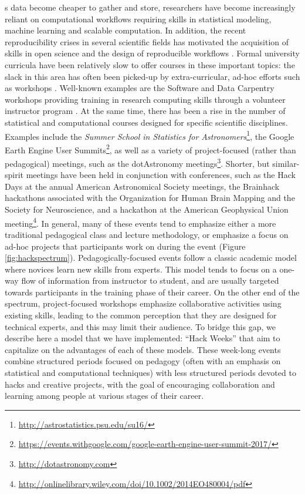 \label{sec:introduction}
s data become cheaper to gather and store, researchers have become increasingly reliant on computational workflows requiring skills in statistical modeling, machine learning and scalable computation. In addition, the recent reproducibility crises in several scientific fields has motivated the acquisition of skills in open science and the design of reproducible workflows \cite[e.g.][]{pashler2012,baker2016}.
Formal university curricula have been relatively slow to offer courses in these important topics: the slack in this area has often been picked-up by extra-curricular, ad-hoc efforts such as workshops \cite{demasi2017}.
Well-known examples are the Software and Data Carpentry workshops providing training in research computing skills through a volunteer instructor program \cite{b:wilson-swc-lessons-2016,teal2015data}.
At the same time, there has been a rise in the number of statistical and computational courses designed for specific scientific disciplines.
Examples include the \textit{Summer School in Statistics for Astronomers}\footnote{\url{http://astrostatistics.psu.edu/su16/}}, the Google Earth Engine User Summits\footnote{\url{https://events.withgoogle.com/google-earth-engine-user-summit-2017/}}, as well as a variety of project-focused (rather than pedagogical) meetings, such as the dotAstronomy meetings\footnote{\url{http://dotastronomy.com}}.
Shorter, but similar-spirit meetings have been held in conjunction with conferences, such as the Hack Days at the annual American Astronomical Society meetings, the Brainhack hackathons associated with the Organization for Human Brain Mapping and the Society for Neuroscience\cite{Cameron_Craddock2016-wc}, and a hackathon at the American Geophysical Union meeting\footnote{\url{http://onlinelibrary.wiley.com/doi/10.1002/2014EO480004/pdf}}. 
In general, many of these events tend to emphasize either a more traditional pedagogical class and lecture methodology, or emphasize a focus on ad-hoc projects that participants work on during the event (Figure \ref{fig:hackspectrum}).
Pedagogically-focused events follow a classic academic model where novices learn new skills from experts. This model tends to focus on a one-way flow of information from instructor to student, and are usually targeted towards participants in the training phase of their career. On the other end of the spectrum, project-focused workshops emphasize collaborative activities using existing skills, leading to the common perception that they are designed for technical experts, and this may limit their audience. 
To bridge this gap, we describe here a model that we have implemented: ``Hack Weeks'' that aim to capitalize on the advantages of each of these models.
These week-long events combine structured periods focused on pedagogy (often with an emphasis on statistical and computational techniques) with less structured periods devoted to hacks and creative projects, with the goal of encouraging collaboration and learning among people at various stages of their career. 

